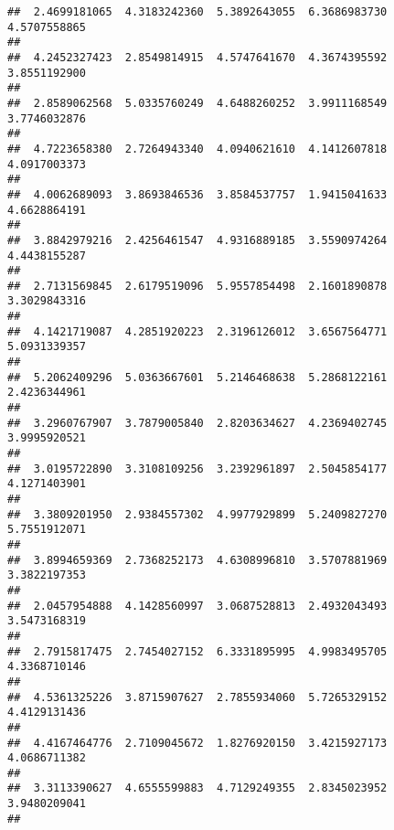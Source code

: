 \documentclass[]{article}
\begin{document}
\begin{verbatim}
##  2.4699181065  4.3183242360  5.3892643055  6.3686983730  4.5707558865 
##                                                                       
##  4.2452327423  2.8549814915  4.5747641670  4.3674395592  3.8551192900 
##                                                                       
##  2.8589062568  5.0335760249  4.6488260252  3.9911168549  3.7746032876 
##                                                                       
##  4.7223658380  2.7264943340  4.0940621610  4.1412607818  4.0917003373 
##                                                                       
##  4.0062689093  3.8693846536  3.8584537757  1.9415041633  4.6628864191 
##                                                                       
##  3.8842979216  2.4256461547  4.9316889185  3.5590974264  4.4438155287 
##                                                                       
##  2.7131569845  2.6179519096  5.9557854498  2.1601890878  3.3029843316 
##                                                                       
##  4.1421719087  4.2851920223  2.3196126012  3.6567564771  5.0931339357 
##                                                                       
##  5.2062409296  5.0363667601  5.2146468638  5.2868122161  2.4236344961 
##                                                                       
##  3.2960767907  3.7879005840  2.8203634627  4.2369402745  3.9995920521 
##                                                                       
##  3.0195722890  3.3108109256  3.2392961897  2.5045854177  4.1271403901 
##                                                                       
##  3.3809201950  2.9384557302  4.9977929899  5.2409827270  5.7551912071 
##                                                                       
##  3.8994659369  2.7368252173  4.6308996810  3.5707881969  3.3822197353 
##                                                                       
##  2.0457954888  4.1428560997  3.0687528813  2.4932043493  3.5473168319 
##                                                                       
##  2.7915817475  2.7454027152  6.3331895995  4.9983495705  4.3368710146 
##                                                                       
##  4.5361325226  3.8715907627  2.7855934060  5.7265329152  4.4129131436 
##                                                                       
##  4.4167464776  2.7109045672  1.8276920150  3.4215927173  4.0686711382 
##                                                                       
##  3.3113390627  4.6555599883  4.7129249355  2.8345023952  3.9480209041 
##                                                                       

\end{verbatim}
\end{document}
